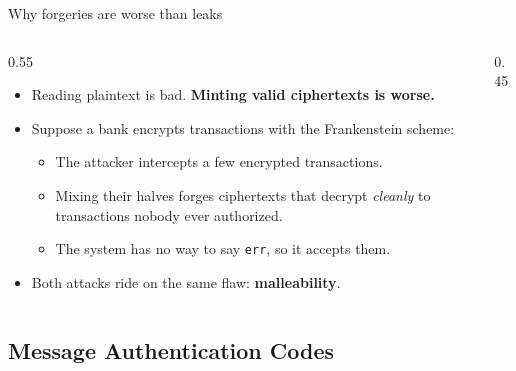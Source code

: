 \ifdefined\PRESENTATION\else\PassOptionsToClass{handout}{beamer}\fi\documentclass[aspectratio=169, lualatex]{beamer}
\begin{document}
\begin{frame}{Why forgeries are worse than leaks}
	\begin{columns}[c]
		\begin{column}{0.55\textwidth}
			\begin{itemize}
				\item Reading plaintext is bad. \textbf{Minting valid ciphertexts is worse.}
				\item Suppose a bank encrypts transactions with the Frankenstein scheme:
				      \begin{itemize}
					      \item The attacker intercepts a few encrypted transactions.
					      \item Mixing their halves forges ciphertexts that decrypt \emph{cleanly} to transactions nobody ever authorized.
					      \item The system has no way to say \texttt{err}, so it accepts them.
				      \end{itemize}
				\item Both attacks ride on the same flaw: \textbf{malleability}.
			\end{itemize}
		\end{column}
		\begin{column}{0.45\textwidth}
		\end{column}
	\end{columns}
\end{frame}

\subsection{Message Authentication Codes}
\end{document}
